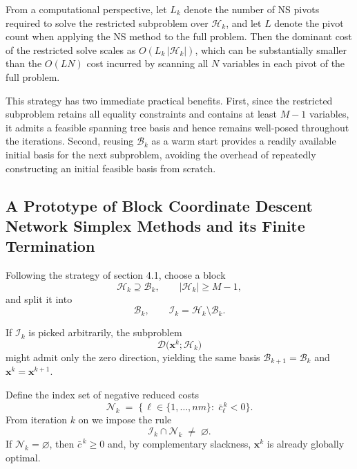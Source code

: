 \documentclass[12pt,a4paper]{article}
\begin{document}
From a computational perspective, let $L_k$ denote the number of NS pivots
required to solve the restricted subproblem over $\mathcal{H}_k$, and let $L$ denote the pivot
count when applying the NS method to the full problem. Then the dominant cost of the
restricted solve scales as $O(L_k\,|\mathcal{H}_k|)$, which can be substantially smaller than the
$O(LN)$ cost incurred by scanning all $N$ variables in each pivot of the full problem.

This strategy has two immediate practical benefits. First, since the
restricted subproblem retains all equality constraints and contains at least $M-1$ variables,
it admits a feasible spanning tree basis and hence remains well-posed throughout the
iterations. Second, reusing $\mathcal{B}_k$ as a warm start provides a readily available initial
basis for the next subproblem, avoiding the overhead of repeatedly constructing an initial
feasible basis from scratch.





\subsection{A Prototype of Block Coordinate Descent Network Simplex Methods and its Finite Termination}

Following the strategy of section 4.1, choose a block
\[
\mathcal H_{k}\supseteq \mathcal{B}_{k},\qquad 
\lvert\mathcal H_{k}\rvert\ge M-1,
\]
and split it into
\[
\mathcal{B}_{k},\qquad
\mathcal I_{k}=\mathcal H_{k}\setminus\mathcal{B}_{k}.
\]

\vspace{2pt}\noindent
If \(\mathcal I_{k}\) is picked arbitrarily, the subproblem
\[
\mathcal D\!\bigl(\mathbf{x}^{k};\mathcal H_{k}\bigr)
\]
might admit only the zero direction, yielding the same basis
\(\mathcal{B}_{k+1}=\mathcal{B}_{k}\) and \(\mathbf{x}^{k}=\mathbf{x}^{k+1}\).

\medskip\noindent
Define the index set of negative reduced costs
\[
\mathcal N_{k}
  \;=\;
  \bigl\{\,\ell\in\{1,\dots,nm\}:\;
           \bar c^{\,k}_{\ell}<0\bigr\}.
\]
From iteration \(k\) on we impose the rule
\begin{equation}\label{eq:descent-block}
  \mathcal I_{k}\cap\mathcal N_{k}\;\neq\;\varnothing.
\end{equation}
If \(\mathcal N_{k}=\varnothing\), then
\(\bar c^{\,k}\ge0\) and, by complementary slackness,
\(\mathbf{x}^{k}\) is already globally optimal.
\end{document}
